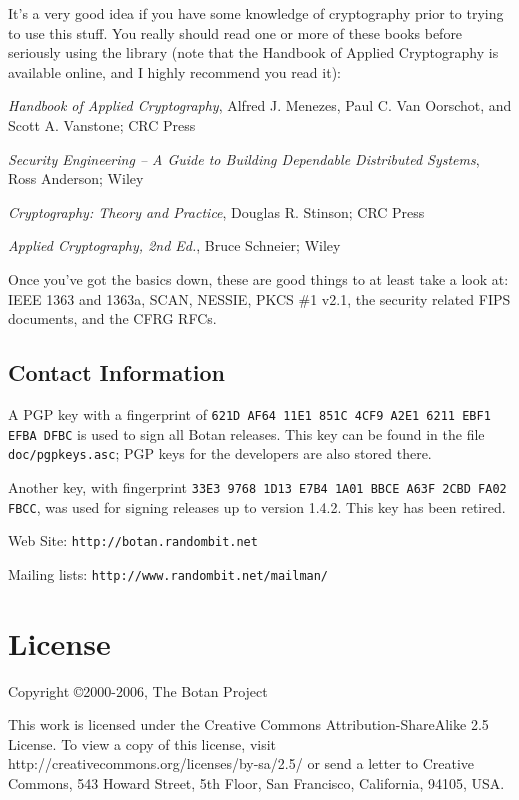 \documentclass{article}
\newcommand{\filename}[1]{\texttt{#1}}
\begin{document}
It's a very good idea if you have some knowledge of cryptography prior to
trying to use this stuff. You really should read one or more of these books
before seriously using the library (note that the Handbook of Applied
Cryptography is available online, and I highly recommend you read it):

\setlength{\parskip}{5pt}

\noindent
\textit{Handbook of Applied Cryptography}, Alfred J. Menezes,
Paul C. Van Oorschot, and Scott A. Vanstone; CRC Press

\noindent
\textit{Security Engineering -- A Guide to Building Dependable Distributed
Systems}, Ross Anderson; Wiley

\noindent
\textit{Cryptography: Theory and Practice}, Douglas R. Stinson; CRC Press

\noindent
\textit{Applied Cryptography, 2nd Ed.}, Bruce Schneier; Wiley

\noindent
Once you've got the basics down, these are good things to at least take a look
at: IEEE 1363 and 1363a, SCAN, NESSIE, PKCS \#1 v2.1, the security related FIPS
documents, and the CFRG RFCs.

\pagebreak

\subsection{Contact Information}

A PGP key with a fingerprint of
\verb|621D AF64 11E1 851C 4CF9 A2E1 6211 EBF1 EFBA DFBC| is used to sign all
Botan releases. This key can be found in the file \filename{doc/pgpkeys.asc};
PGP keys for the developers are also stored there.

Another key, with fingerprint
\verb|33E3 9768 1D13 E7B4 1A01 BBCE A63F 2CBD FA02 FBCC|, was used for signing
releases up to version 1.4.2. This key has been retired.

\vskip 5pt \noindent
Web Site: \verb|http://botan.randombit.net|

\vskip 5pt \noindent
Mailing lists: \verb|http://www.randombit.net/mailman/|

\pagebreak

\section{License}

Copyright \copyright  2000-2006, The Botan Project

This work is licensed under the Creative Commons Attribution-ShareAlike 2.5
License. To view a copy of this license, visit
http://creativecommons.org/licenses/by-sa/2.5/ or send a letter to Creative
Commons, 543 Howard Street, 5th Floor, San Francisco, California, 94105, USA.
\end{document}
